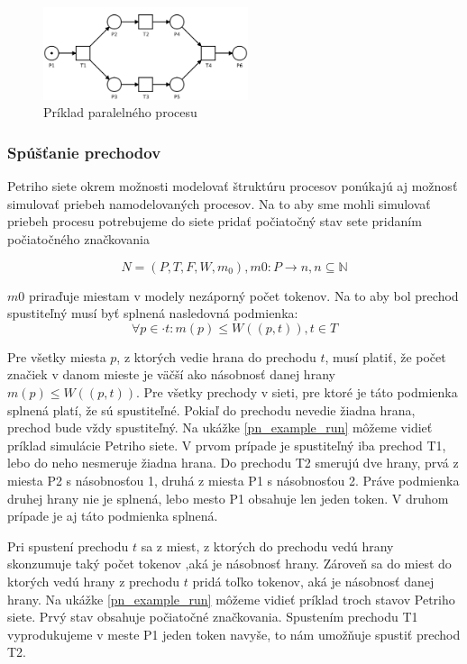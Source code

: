 \begin{figure}[!htbp]
\centering
\includegraphics[width=6cm]{img/basic_net.png}
\caption{Príklad paralelného procesu}
\label{basic_net}
\end{figure}


\subsubsection{Spúšťanie prechodov}
Petriho siete okrem možnosti modelovať štruktúru procesov ponúkajú aj možnosť simulovať priebeh namodelovaných procesov.
Na to aby sme mohli simulovať priebeh procesu potrebujeme do siete pridať počiatočný stav sete pridaním počiatočného značkovania  

\[N = (P, T, F, W, m_0 ), m0: P \rightarrow n, n \subseteq \mathbb N\]

$m0$ priraďuje miestam v modely nezáporný počet tokenov. Na to aby bol prechod spustiteľný musí byť splnená nasledovná podmienka:
\[ \forall p \in \cdot t: m(p) \leq W((p,t)), t \in T\]

Pre všetky miesta $p$, z ktorých vedie hrana do prechodu $t$, musí platiť, že počet značiek v danom mieste je väčší ako násobnosť danej hrany $ m(p) \leq W((p,t)) $. Pre všetky prechody v sieti, pre ktoré je táto podmienka splnená platí, že sú spustiteľné. Pokiaľ do prechodu nevedie žiadna hrana, prechod bude vždy spustiteľný.
Na ukážke \ref {pn_example_run} môžeme vidieť príklad simulácie Petriho siete. V prvom prípade je spustiteľný iba prechod T1, lebo do neho nesmeruje žiadna hrana. Do prechodu T2 smerujú dve hrany, prvá z miesta P2 s násobnosťou 1, druhá z miesta P1 s násobnosťou 2. Práve podmienka druhej hrany nie je splnená, lebo mesto P1 obsahuje len jeden token. V druhom prípade je aj táto podmienka splnená.
 
Pri spustení prechodu $t$ sa z miest, z ktorých do prechodu vedú hrany skonzumuje taký počet tokenov ,aká je násobnosť hrany. Zároveň sa do miest do ktorých vedú hrany z prechodu $t$ pridá toľko tokenov, aká je násobnosť danej hrany. Na ukážke \ref{pn_example_run} môžeme vidieť príklad troch stavov Petriho siete. Prvý stav obsahuje počiatočné značkovania. 
Spustením prechodu T1 vyprodukujeme v meste P1 jeden token navyše, to nám umožňuje spustiť prechod T2. 

